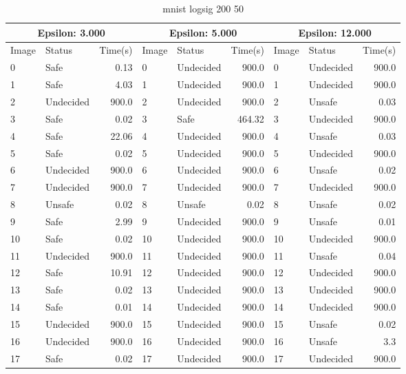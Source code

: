 \begin{table}[!ht]
  \centering
  \caption{mnist logsig 200 50}
  \footnotesize
  \begin{tabular}{|llr|llr|llr|}
    \toprule
    \multicolumn{3}{|c|}{Epsilon: 3.000} & \multicolumn{3}{|c|}{Epsilon: 5.000} & \multicolumn{3}{|c|}{Epsilon: 12.000} \\
    \midrule
    Image & Status & Time(s) &Image & Status & Time(s) &Image & Status & Time(s)\\ 
    \midrule
    0 & Safe & 0.13 &    0 & Undecided & 900.0 &    0 & Undecided & 900.0\\ 
    1 & Safe & 4.03 &    1 & Undecided & 900.0 &    1 & Undecided & 900.0\\ 
    2 & Undecided & 900.0 &    2 & Undecided & 900.0 &    2 & Unsafe & 0.03\\ 
    3 & Safe & 0.02 &    3 & Safe & 464.32 &    3 & Undecided & 900.0\\ 
    4 & Safe & 22.06 &    4 & Undecided & 900.0 &    4 & Unsafe & 0.03\\ 
    5 & Safe & 0.02 &    5 & Undecided & 900.0 &    5 & Undecided & 900.0\\ 
    6 & Undecided & 900.0 &    6 & Undecided & 900.0 &    6 & Unsafe & 0.02\\ 
    7 & Undecided & 900.0 &    7 & Undecided & 900.0 &    7 & Undecided & 900.0\\ 
    8 & Unsafe & 0.02 &    8 & Unsafe & 0.02 &    8 & Unsafe & 0.02\\ 
    9 & Safe & 2.99 &    9 & Undecided & 900.0 &    9 & Unsafe & 0.01\\ 
    10 & Safe & 0.02 &    10 & Undecided & 900.0 &    10 & Undecided & 900.0\\ 
    11 & Undecided & 900.0 &    11 & Undecided & 900.0 &    11 & Unsafe & 0.04\\ 
    12 & Safe & 10.91 &    12 & Undecided & 900.0 &    12 & Undecided & 900.0\\ 
    13 & Safe & 0.02 &    13 & Undecided & 900.0 &    13 & Undecided & 900.0\\ 
    14 & Safe & 0.01 &    14 & Undecided & 900.0 &    14 & Undecided & 900.0\\ 
    15 & Undecided & 900.0 &    15 & Undecided & 900.0 &    15 & Unsafe & 0.02\\ 
    16 & Undecided & 900.0 &    16 & Undecided & 900.0 &    16 & Unsafe & 3.3\\ 
    17 & Safe & 0.02 &    17 & Undecided & 900.0 &    17 & Undecided & 900.0\\ 

\end{tabular}
\end{table}
